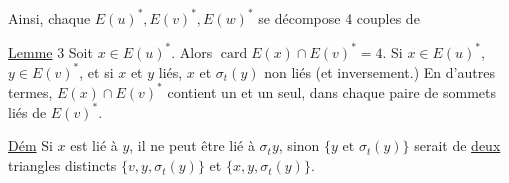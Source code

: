 
Ainsi, chaque $E(u)^*,E(v)^*,E(w)^*$ se décompose  4 couples de 

\uline{Lemme} 3 Soit $x\in E(u)^*$. Alors $\operatorname{card} E(x)\cap E(v)^*=4$. Si $x\in E(u)^*$, $y\in E(v)^*$, et si $x$ et $y$ liés, $x$ et $\sigma_t(y)$ non liés (et inversement.) En d'autres termes, $E(x)\cap E(v)^*$ contient un  et un seul, dans chaque paire de sommets liés de $E(v)^*$.

\uline{Dém} Si $x$ est lié à $y$, il ne peut être lié à $\sigma_t y$, sinon $\{y\text{ et }\sigma_t(y)\}$ serait  de \uline{deux} triangles distincts $\{v,y,\sigma_t(y)\}$ et $\{x,y,\sigma_t(y)\}$.   
